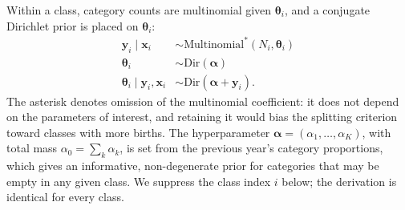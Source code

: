 Within a class, category counts are multinomial given
$\boldsymbol{\theta}_i$, and a conjugate Dirichlet prior is placed on
$\boldsymbol{\theta}_i$:
\begin{align*}
\mathbf{y}_i \mid \mathbf{x}_i
   &\sim \text{Multinomial}^{\ast}(N_i,\boldsymbol{\theta}_i)\\
\boldsymbol{\theta}_i &\sim \mathrm{Dir}(\boldsymbol{\alpha})\\
\boldsymbol{\theta}_i \mid \mathbf{y}_i,\mathbf{x}_i
   &\sim \mathrm{Dir}(\boldsymbol{\alpha}+\mathbf{y}_i).
\end{align*}
The asterisk denotes omission of the multinomial coefficient: it does not
depend on the parameters of interest, and retaining it would bias the splitting
criterion toward classes with more births. The hyperparameter
$\boldsymbol{\alpha}=(\alpha_1,\dots,\alpha_K)$, with total mass
$\alpha_0=\sum_k\alpha_k$, is set from the previous year's category
proportions, which gives an informative, non-degenerate prior for categories
that may be empty in any given class. We suppress the class index $i$ below;
the derivation is identical for every class.

